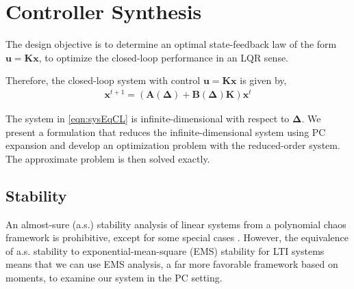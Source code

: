 \documentclass[letterpaper, 10 pt, conference]{ieeeconf}  %
\newcommand{\vo}[1]{\boldsymbol{#1}}
\begin{document}
\section{Controller Synthesis}
The design objective is to determine an optimal state-feedback law of the form $\vo{u} = \vo{Kx}$, to optimize the closed-loop performance in an LQR sense.

Therefore, the closed-loop system with control $\vo{u} = \vo{Kx}$ is given by,
\begin{align}
   \vo{x}^{t+1} = (\vo{A(\Delta) + B(\Delta)K})\vo{x}^t
   \label{eqn:sysEqCL}
\end{align}

The system in \eqref{eqn:sysEqCL} is infinite-dimensional with respect to $\vo{\Delta}$. We present a formulation that reduces the infinite-dimensional system using PC expansion and develop an optimization problem with the reduced-order system. The approximate problem is then solved exactly.

\subsection{Stability}
An almost-sure (a.s.) stability analysis of linear systems from a polynomial chaos framework is prohibitive, except for some special cases \cite{dutta2010nonlinear, ghanem2003stochastic}. However, the equivalence of a.s. stability to exponential-mean-square (EMS) stability for LTI systems \cite{chen1995linear} means that we can use EMS  analysis, a far more favorable framework based on moments, to examine our system in the PC setting.
\end{document}
